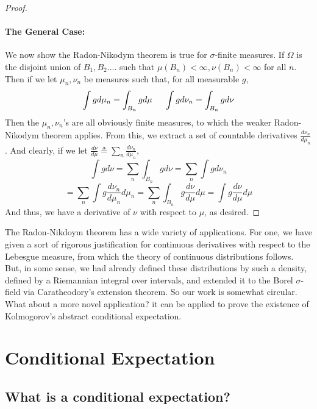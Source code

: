 \begin{proof}
    \paragraph{The General Case:} We now show the Radon-Nikodym theorem is true for 
    $\sigma$-finite measures. If $\Omega$ is the disjoint union of $B_1, B_2....$ such that 
    $\mu(B_n) <\infty, \nu(B_n) < \infty$ for all $n$. Then if we let $\mu_n, \nu_n$ be measures 
    such that, for all measurable $g$,
    \[ \int g d\mu_n = \int_{B_n} gd\mu \hspace{0.5cm} \int g d\nu_n = \int_{B_n}g d\nu \]
    Then the $\mu_n, \nu_n$'s are all obviously finite measures, to which the weaker Radon-Nikodym 
    theorem applies. From this, we extract a set of countable derivatives 
    $\frac{d\nu_n}{d\mu_n}$. And clearly, if we let $\frac{d\nu}{d\mu} \triangleq \sum_n \frac{d\nu_n}{d\mu_n}$,
    \[ \int gd\nu = \sum_n \int_{B_n}g d\nu = \sum_n \int gd\nu_n \] 
    \[ = \sum_n \int g \frac{d\nu_n}{d\mu_n}d\mu_n  = \sum_n \int_{B_n} g  \frac{d\nu}{d\mu}d\mu = \int g \frac{d\nu}{d\mu}d\mu \]
    And thus, we have a derivative of $\nu$ with respect to $\mu$, as desired.

\end{proof}

The Radon-Nikdoym theorem has a wide variety of applications. For one, we have given a sort of rigorous justification 
for continuous derivatives with respect to the Lebesgue measure, from which the theory of continuous 
distributions follows. But, in some sense, we had already defined these distributions by such a density, defined by 
a Riemannian integral over intervals, and extended it to the Borel $\sigma$-field via Caratheodory's extension theorem.
So our work is somewhat circular. What about a more novel application?
it can be applied to prove the existence of Kolmogorov's abstract conditional expectation.

\section{Conditional Expectation}
\subsection{What is a conditional expectation?}

